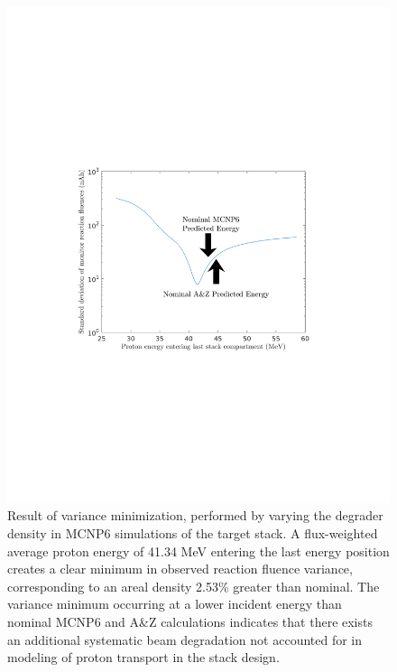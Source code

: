 \documentclass[3p]{elsarticle}
\begin{document}
\begin{figure}
 \centering
 \includegraphics[clip=true,trim=1.5in 3.4in 1.8in 3.5in, scale=0.8]{./figures/variation_curve.pdf}
 \caption{Result of variance minimization, performed by varying the degrader density in MCNP6 simulations of the target stack.  A flux-weighted average proton energy of 41.34 MeV entering the last energy position creates a clear minimum in observed reaction fluence variance, corresponding to an areal density 2.53\% greater than nominal. The variance minimum occurring at a lower incident energy than nominal MCNP6 and A\&Z calculations indicates that there exists an additional systematic beam degradation not accounted for in modeling of proton transport in the stack design.}
 \label{fig:variation_curve}
\end{figure}
\end{document}
